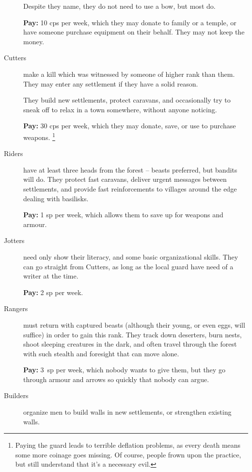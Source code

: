 \begin{multicols}{2}
\begin{description}
  Despite they name, they do not need to use a bow, but most do.

  \textbf{Pay:} 10 \glspl{cp} per week, which they may donate to family or a temple, or have someone purchase equipment on their behalf.
  They may not keep the money.

  \item[Cutters]
  make a kill which was witnessed by someone of higher rank than them.
  They may enter any settlement if they have a solid reason.

  They build new settlements, protect caravans, and occasionally try to sneak off to relax in a town somewhere, without anyone noticing.

  \textbf{Pay:} 30 \glspl{cp} per week, which they may donate, save, or use to purchase weapons.%
  \footnote{Paying the \gls{guard} leads to terrible deflation problems, as every death means some more coinage goes missing.
  Of course, people frown upon the practice, but still understand that it's a necessary evil.}

  \item[Riders]
  have at least three heads from the forest -- beasts preferred, but bandits will do.
  They protect fast caravans, deliver urgent messages between settlements, and provide fast reinforcements to villages around the \gls{edge} dealing with basilisks.

  \textbf{Pay:} 1 \gls{sp} per week, which allows them to save up for weapons and armour.

  \item[Jotters]
  need only show their literacy, and some basic organizational skills.
  They can go straight from Cutters, as long as the local \gls{guard} have need of a writer at the time.

  \textbf{Pay:} 2 \gls{sp} per week.

  \item[Rangers]
  must return with captured beasts (although their young, or even eggs, will suffice) in order to gain this rank.
  They track down deserters, burn nests, shoot sleeping creatures in the dark, and often travel through the forest with such stealth and foresight that can move alone.
  
  \textbf{Pay:} 3~\gls{sp} per week, which nobody wants to give them, but they go through armour and arrows so quickly that nobody can argue.

  \item[Builders]
  organize men to build walls in new settlements, or strengthen existing walls.


\end{description}
\end{multicols}
